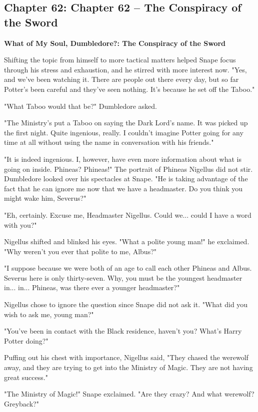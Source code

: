 \documentclass[a4paper,11pt]{article}
\begin{document}
\subsection{Chapter 62: Chapter 62 – The Conspiracy of the Sword}

\textbf{What of My Soul, Dumbledore?: The Conspiracy of the Sword}

Shifting the topic from himself to more tactical matters helped Snape focus through his stress and exhaustion, and he stirred with more interest now. "Yes, and we've been watching it. There are people out there every day, but so far Potter's been careful and they've seen nothing. It's because he set off the Taboo."

"What Taboo would that be?" Dumbledore asked.

"The Ministry's put a Taboo on saying the Dark Lord's name. It was picked up the first night. Quite ingenious, really. I couldn't imagine Potter going for any time at all without using the name in conversation with his friends."

"It is indeed ingenious. I, however, have even more information about what is going on inside. Phineas? Phineas!" The portrait of Phineas Nigellus did not stir. Dumbledore looked over his spectacles at Snape. "He is taking advantage of the fact that he can ignore me now that we have a headmaster. Do you think you might wake him, Severus?"

"Eh, certainly. Excuse me, Headmaster Nigellus. Could we... could I have a word with you?"

Nigellus shifted and blinked his eyes. "What a polite young man!" he exclaimed. "Why weren't you ever that polite to me, Albus?"

"I suppose because we were both of an age to call each other Phineas and Albus. Severus here is only thirty-seven. Why, you must be the youngest headmaster in... in... Phineas, was there ever a younger headmaster?"

Nigellus chose to ignore the question since Snape did not ask it. "What did you wish to ask me, young man?"

"You've been in contact with the Black residence, haven't you? What's Harry Potter doing?"

Puffing out his chest with importance, Nigellus said, "They chased the werewolf away, and they are trying to get into the Ministry of Magic. They are not having great success."

"The Ministry of Magic!" Snape exclaimed. "Are they crazy? And what werewolf? Greyback?"
\end{document}
